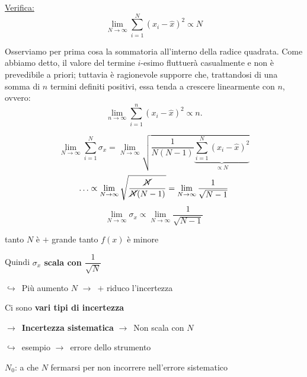 \documentclass[11pt,a4paper,oneside]{book}
\newcommand{\grigio}[1]{{\color{grigio}#1}}
\newcommand{\fr}{\ensuremath{\rightarrow}}
\newcommand{\giu}{\ensuremath{\hookrightarrow}}
\newcommand{\chiave}[1]{\textbf{#1}}
\begin{document}
\underline{Verifica:}
\[
  \lim_{N \to \infty} \sum_{i=1}^{N} (x_i - \hat{x})^2 \propto N
\]

\begin{nota}
Osserviamo per prima cosa la sommatoria all'interno della radice quadrata. Come abbiamo detto, il valore del termine $i$-esimo fluttuerà casualmente e non è prevedibile a priori; tuttavia è ragionevole supporre che, trattandosi di una somma di $n$ termini definiti positivi, essa tenda a crescere linearmente con $n$, ovvero:
\[
  \lim_{n \to \infty} \sum_{i=1}^{n} (x_i - \hat{x})^2 \propto n.
\]
\end{nota}

\[
  \lim_{N \to \infty} \sum_{i=1}^{N} \sigma_x = \lim_{N \to \infty} \sqrt{\frac{1}{N(N-1)} \underbrace{\sum_{i=1}^{N} (x_i - \hat{x})^2}_{\propto N}}
\]
\[
  \ldots \propto \lim_{N \to \infty} \sqrt{\frac{\cancel{N}}{\cancel{N}(N-1)}} = \lim_{N \to \infty} \frac{1}{\sqrt{N-1}}
\]
\[
  \lim_{N \to \infty} \sigma_x \propto \lim_{N \to \infty} \frac{1}{\sqrt{N-1}}
\]

\begin{center}

\grigio{tanto $N$ è $+$ grande tanto $f(x)$ è minore}
\end{center}

Quindi \chiave{$\sigma_x$ scala con $\dfrac{1}{\sqrt{N}}$}

\giu\ Più aumento $N$ \fr\ $+$ riduco l'incertezza

Ci sono \chiave{vari tipi di incertezza}

\fr\ \chiave{Incertezza sistematica} \fr\ Non scala con $N$

\quad\giu\ esempio \fr\ errore dello strumento

\begin{center}
\end{center}
$N_0$: a che $N$ fermarsi per non incorrere nell'errore sistematico
\end{document}
